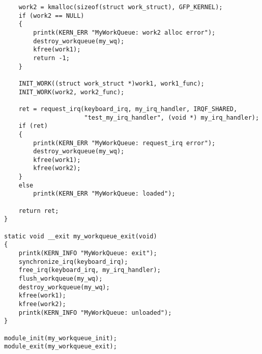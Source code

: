 \documentclass{bmstu}
\begin{document}
\begin{lstlisting}
    work2 = kmalloc(sizeof(struct work_struct), GFP_KERNEL);
    if (work2 == NULL)
    {
        printk(KERN_ERR "MyWorkQueue: work2 alloc error");
        destroy_workqueue(my_wq);
        kfree(work1);
        return -1;
    }

    INIT_WORK((struct work_struct *)work1, work1_func);
    INIT_WORK(work2, work2_func);

    ret = request_irq(keyboard_irq, my_irq_handler, IRQF_SHARED,
                      "test_my_irq_handler", (void *) my_irq_handler);
    if (ret)
    {
        printk(KERN_ERR "MyWorkQueue: request_irq error");
        destroy_workqueue(my_wq);
        kfree(work1);
        kfree(work2);
    }
    else
        printk(KERN_ERR "MyWorkQueue: loaded");

    return ret;
}

static void __exit my_workqueue_exit(void)
{
    printk(KERN_INFO "MyWorkQueue: exit");
    synchronize_irq(keyboard_irq);
    free_irq(keyboard_irq, my_irq_handler);
    flush_workqueue(my_wq);
    destroy_workqueue(my_wq);
    kfree(work1);
    kfree(work2);
    printk(KERN_INFO "MyWorkQueue: unloaded");
}

module_init(my_workqueue_init);
module_exit(my_workqueue_exit);
\end{lstlisting}
\end{document}
